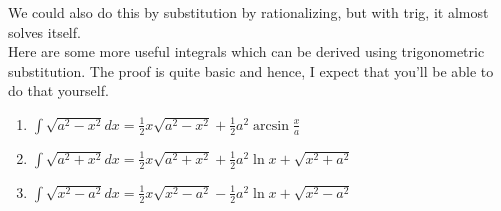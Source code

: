 We could also do this by substitution by rationalizing, but with trig, it almost solves itself.\\
Here are some more useful integrals which can be derived using trigonometric substitution. The proof is quite basic and hence, I expect that you'll be able to do that yourself.\\
\begin{theorem}
    \begin{enumerate}
        \item $\int \sqrt{a^2-x^2} dx = \frac{1}{2}x\sqrt{a^2-x^2}+\frac{1}{2}a^2\arcsin{\frac{x}{a}}$
        \item $\int \sqrt{a^2+x^2} dx = \frac{1}{2}x\sqrt{a^2+x^2}+\frac{1}{2}a^2\ln{x+\sqrt{x^2+a^2}}$
        \item $\int \sqrt{x^2-a^2} dx = \frac{1}{2}x\sqrt{x^2-a^2}-\frac{1}{2}a^2\ln{x+\sqrt{x^2-a^2}}$
    \end{enumerate}
\end{theorem}
